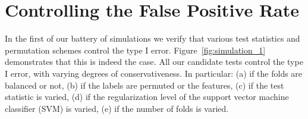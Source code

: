 \documentclass[12pt,a4paper]{article}
\begin{document}
\section{Controlling the False Positive Rate}
\label{sec:type_i}

In the first of our battery of simulations we verify that various test statistics and permutation schemes control the type I error. 
Figure~\ref{fig:simulation_1} demonstrates that this is indeed the case. 
All our candidate tests control the type I error, with varying degrees of conservativeness. 
In particular:
(a) if the folds are balanced or not,
(b) if the labels are permuted or the features, 
(c) if the test statistic is varied, 
(d) if the regularization level of the support vector machine classifier (SVM) is varied,
(e) if the number of folds is varied.
\end{document}
